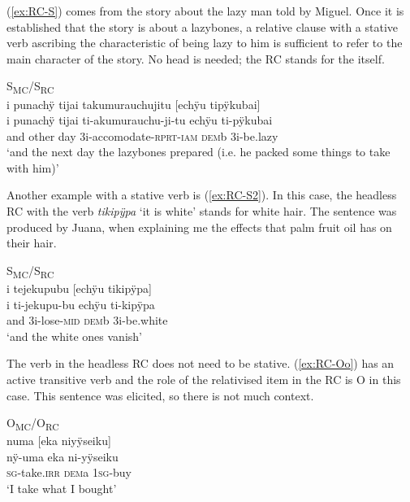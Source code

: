 (\ref{ex:RC-S}) comes from the story about the lazy man told by Miguel. Once it is established that the story is about a lazybones, a relative clause with a stative verb ascribing the characteristic of being lazy to him is sufficient to refer to the main character of the story. No head is needed; the RC stands for the  itself.

\ea\label{ex:RC-S}
\begingl
\glpreamble \textup{S\textsubscript{MC}/S\textsubscript{RC}}\\i punachÿ tijai takumurauchujitu \textup{[}echÿu tipÿkubai\textup{]}\\
\gla i punachÿ tijai ti-akumurauchu-ji-tu echÿu ti-pÿkubai\\
\glb and other day 3i-accomodate-\textsc{rprt}-\textsc{iam} \textsc{dem}b 3i-be.lazy\\
\glft ‘and the next day the lazybones prepared (i.e. he packed some things to take with him)’
\endgl
\trailingcitation{[mox-n110920l.082]}
\xe

Another example with a stative verb is (\ref{ex:RC-S2}). In this case, the headless RC with the verb \textit{tikipÿpa} ‘it is white’ stands for white hair. The sentence was produced by Juana, when explaining me the effects that palm fruit oil has on their hair.

\ea\label{ex:RC-S2}
\begingl
\glpreamble \textup{S\textsubscript{MC}/S\textsubscript{RC}}\\i tejekupubu \textup{[}echÿu tikipÿpa\textup{]}\\
\gla  i ti-jekupu-bu echÿu ti-kipÿpa\\
\glb and 3i-lose-\textsc{mid} \textsc{dem}b 3i-be.white\\
\glft ‘and the white ones vanish’
\endgl
\trailingcitation{[jxx-d181102l.32]}
\xe

The verb in the headless RC does not need to be stative. (\ref{ex:RC-Oo}) has an active transitive verb and the role of the relativised item in the RC is O in this case. This sentence was elicited, so there is not much context.

\ea\label{ex:RC-Oo}
\begingl
\glpreamble \textup{O\textsubscript{MC}/O\textsubscript{RC}}\\numa \textup{[}eka niyÿseiku\textup{]}\\
\gla nÿ-uma eka ni-yÿseiku\\
\textsc{sg}-take.\textsc{irr} \textsc{dem}a 1\textsc{sg}-buy\\
\glft ‘I take what I bought’
\endgl
\trailingcitation{[jxx-e191021e-2]}%
\xe



